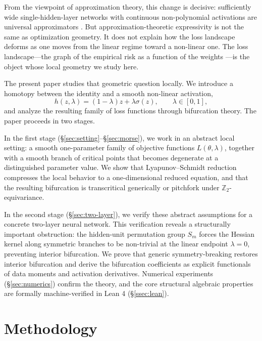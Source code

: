 \documentclass[11pt, reqno]{amsart}
\theoremstyle{plain}
\theoremstyle{definition}
\theoremstyle{remark}
\begin{document}
From the viewpoint of approximation theory, this change is decisive: sufficiently wide single-hidden-layer networks with continuous non-polynomial activations are universal approximators \cite{hornik1989,hornik1991,leshno1993}. But approximation-theoretic expressivity is not the same as optimization geometry. It does not explain how the loss landscape deforms as one moves from the linear regime toward a non-linear one. The loss landscape---the graph of the empirical risk as a function of the weights \cite{petersen2026}---is the object whose local geometry we study here.

The present paper studies that geometric question locally. We introduce a homotopy between the identity and a smooth non-linear activation,
\begin{equation}\label{eq:homotopy}
  h(z,\lambda)=(1-\lambda)z+\lambda\sigma(z), \qquad \lambda\in[0,1],
\end{equation}
and analyze the resulting family of loss functions through bifurcation theory. The paper proceeds in two stages.

In the first stage (\S\ref{sec:setting}--\S\ref{sec:morse}), we work in an abstract local setting: a smooth one-parameter family of objective functions $L(\theta,\lambda)$, together with a smooth branch of critical points that becomes degenerate at a distinguished parameter value. We show that Lyapunov--Schmidt reduction compresses the local behavior to a one-dimensional reduced equation, and that the resulting bifurcation is transcritical generically or pitchfork under $\mathbb Z_2$-equivariance.

In the second stage (\S\ref{sec:two-layer}), we verify these abstract assumptions for a concrete two-layer neural network. This verification reveals a structurally important obstruction: the hidden-unit permutation group $S_m$ forces the Hessian kernel along symmetric branches to be non-trivial at the linear endpoint $\lambda=0$, preventing interior bifurcation. We prove that generic symmetry-breaking restores interior bifurcation and derive the bifurcation coefficients as explicit functionals of data moments and activation derivatives. Numerical experiments (\S\ref{sec:numerics}) confirm the theory, and the core structural algebraic properties are formally machine-verified in Lean 4 (\S\ref{ssec:lean}).

\section{Methodology}
\end{document}
